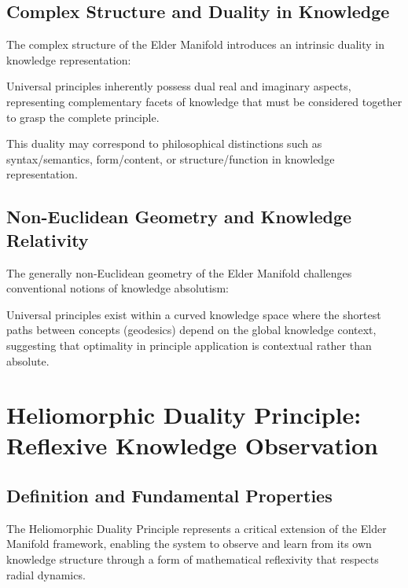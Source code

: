 \subsection{Complex Structure and Duality in Knowledge}

The complex structure of the Elder Manifold introduces an intrinsic duality in knowledge representation:

\begin{proposition}
Universal principles inherently possess dual real and imaginary aspects, representing complementary facets of knowledge that must be considered together to grasp the complete principle.
\end{proposition}

This duality may correspond to philosophical distinctions such as syntax/semantics, form/content, or structure/function in knowledge representation.

\subsection{Non-Euclidean Geometry and Knowledge Relativity}

The generally non-Euclidean geometry of the Elder Manifold challenges conventional notions of knowledge absolutism:

\begin{proposition}
Universal principles exist within a curved knowledge space where the shortest paths between concepts (geodesics) depend on the global knowledge context, suggesting that optimality in principle application is contextual rather than absolute.
\end{proposition}

\section{Heliomorphic Duality Principle: Reflexive Knowledge Observation}

\subsection{Definition and Fundamental Properties}

The Heliomorphic Duality Principle represents a critical extension of the Elder Manifold framework, enabling the system to observe and learn from its own knowledge structure through a form of mathematical reflexivity that respects radial dynamics.

